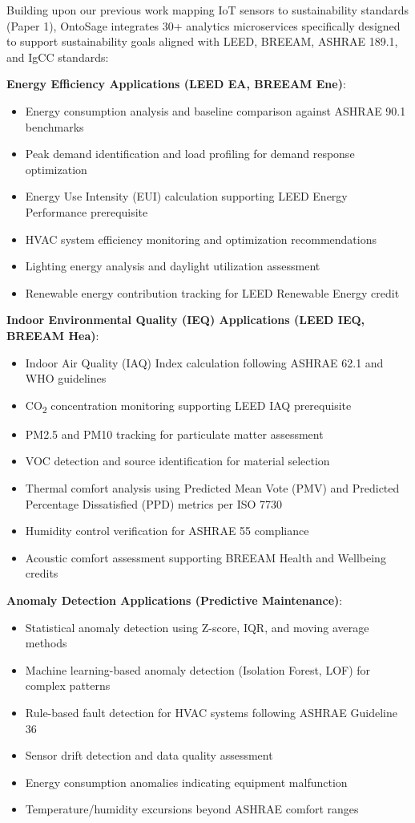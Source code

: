 \documentclass[acmlarge]{acmart}
\begin{document}
Building upon our previous work mapping IoT sensors to sustainability standards (Paper 1), OntoSage integrates 30+ analytics microservices specifically designed to support sustainability goals aligned with LEED, BREEAM, ASHRAE 189.1, and IgCC standards:

\textbf{Energy Efficiency Applications (LEED EA, BREEAM Ene)}:
\begin{itemize}
    \item Energy consumption analysis and baseline comparison against ASHRAE 90.1 benchmarks
    \item Peak demand identification and load profiling for demand response optimization
    \item Energy Use Intensity (EUI) calculation supporting LEED Energy Performance prerequisite
    \item HVAC system efficiency monitoring and optimization recommendations
    \item Lighting energy analysis and daylight utilization assessment
    \item Renewable energy contribution tracking for LEED Renewable Energy credit
\end{itemize}

\textbf{Indoor Environmental Quality (IEQ) Applications (LEED IEQ, BREEAM Hea)}:
\begin{itemize}
    \item Indoor Air Quality (IAQ) Index calculation following ASHRAE 62.1 and WHO guidelines
    \item CO\textsubscript{2} concentration monitoring supporting LEED IAQ prerequisite
    \item PM2.5 and PM10 tracking for particulate matter assessment
    \item VOC detection and source identification for material selection
    \item Thermal comfort analysis using Predicted Mean Vote (PMV) and Predicted Percentage Dissatisfied (PPD) metrics per ISO 7730
    \item Humidity control verification for ASHRAE 55 compliance
    \item Acoustic comfort assessment supporting BREEAM Health and Wellbeing credits
\end{itemize}

\textbf{Anomaly Detection Applications (Predictive Maintenance)}:
\begin{itemize}
    \item Statistical anomaly detection using Z-score, IQR, and moving average methods
    \item Machine learning-based anomaly detection (Isolation Forest, LOF) for complex patterns
    \item Rule-based fault detection for HVAC systems following ASHRAE Guideline 36
    \item Sensor drift detection and data quality assessment
    \item Energy consumption anomalies indicating equipment malfunction
    \item Temperature/humidity excursions beyond ASHRAE comfort ranges
\end{itemize}
\end{document}
